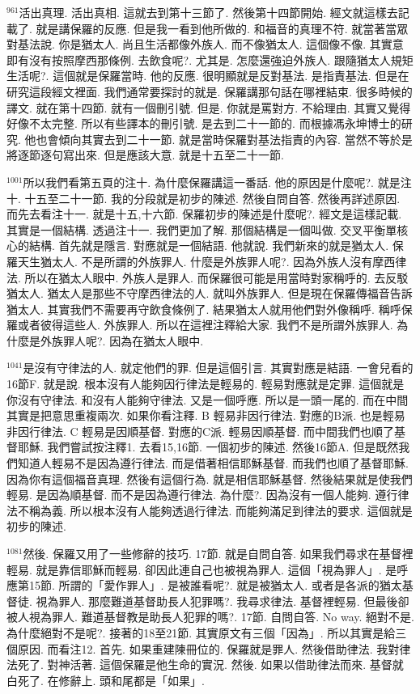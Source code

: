 \documentclass{book}
\begin{document}
$^{961}$活出真理.
活出真相.
這就去到第十三節了.
然後第十四節開始.
經文就這樣去記載了.
就是講保羅的反應.
但是我一看到他所做的.
和福音的真理不符.
就當著當眾對基法說.
你是猶太人.
尚且生活都像外族人.
而不像猶太人.
這個像不像.
其實意即有沒有按照摩西那條例.
去飲食呢?.
尤其是.
怎麼還強迫外族人.
跟隨猶太人規矩生活呢?.
這個就是保羅當時.
他的反應.
很明顯就是反對基法.
是指責基法.
但是在研究這段經文裡面.
我們通常要探討的就是.
保羅講那句話在哪裡結束.
很多時候的譯文.
就在第十四節.
就有一個刪引號.
但是.
你就是罵對方.
不給理由.
其實又覺得好像不太完整.
所以有些譯本的刪引號.
是去到二十一節的.
而根據馮永坤博士的研究.
他也會傾向其實去到二十一節.
就是當時保羅對基法指責的內容.
當然不等於是將逐節逐句寫出來.
但是應該大意.
就是十五至二十一節.

$^{1001}$所以我們看第五頁的注十.
為什麼保羅講這一番話.
他的原因是什麼呢?.
就是注十.
十五至二十一節.
我的分段就是初步的陳述.
然後自問自答.
然後再詳述原因.
而先去看注十一.
就是十五,十六節.
保羅初步的陳述是什麼呢?.
經文是這樣記載.
其實是一個結構.
透過注十一.
我們更加了解.
那個結構是一個叫做.
交叉平衡單核心的結構.
首先就是隱言.
對應就是一個結語.
他就說.
我們新來的就是猶太人.
保羅天生猶太人.
不是所謂的外族罪人.
什麼是外族罪人呢?.
因為外族人沒有摩西律法.
所以在猶太人眼中.
外族人是罪人.
而保羅很可能是用當時對家稱呼的.
去反駁猶太人.
猶太人是那些不守摩西律法的人.
就叫外族罪人.
但是現在保羅傳福音告訴猶太人.
其實我們不需要再守飲食條例了.
結果猶太人就用他們對外像稱呼.
稱呼保羅或者彼得這些人.
外族罪人.
所以在這裡注釋給大家.
我們不是所謂外族罪人.
為什麼是外族罪人呢?.
因為在猶太人眼中.

$^{1041}$是沒有守律法的人.
就定他們的罪.
但是這個引言.
其實對應是結語.
一會兒看的16節F.
就是說.
根本沒有人能夠因行律法是輕易的.
輕易對應就是定罪.
這個就是你沒有守律法.
和沒有人能夠守律法.
又是一個呼應.
所以是一頭一尾的.
而在中間其實是把意思重複兩次.
如果你看注釋.
B 輕易非因行律法.
對應的B派.
也是輕易非因行律法.
C 輕易是因順基督.
對應的C派.
輕易因順基督.
而中間我們也順了基督耶穌.
我們嘗試按注釋1.
去看15,16節.
一個初步的陳述.
然後16節A.
但是既然我們知道人輕易不是因為遵行律法.
而是借著相信耶穌基督.
而我們也順了基督耶穌.
因為你有這個福音真理.
然後有這個行為.
就是相信耶穌基督.
然後結果就是使我們輕易.
是因為順基督.
而不是因為遵行律法.
為什麼?.
因為沒有一個人能夠.
遵行律法不稱為義.
所以根本沒有人能夠透過行律法.
而能夠滿足到律法的要求.
這個就是初步的陳述.

$^{1081}$然後.
保羅又用了一些修辭的技巧.
17節.
就是自問自答.
如果我們尋求在基督裡輕易.
就是靠信耶穌而輕易.
卻因此連自己也被視為罪人.
這個「視為罪人」.
是呼應第15節.
所謂的「愛作罪人」.
是被誰看呢?.
就是被猶太人.
或者是各派的猶太基督徒.
視為罪人.
那麼難道基督助長人犯罪嗎?.
我尋求律法.
基督裡輕易.
但最後卻被人視為罪人.
難道基督教是助長人犯罪的嗎?.
17節.
自問自答.
No way.
絕對不是.
為什麼絕對不是呢?.
接著的18至21節.
其實原文有三個「因為」.
所以其實是給三個原因.
而看注12.
首先.
如果重建陳冊位的.
保羅就是罪人.
然後借助律法.
我對律法死了.
對神活著.
這個保羅是他生命的實況.
然後.
如果以借助律法而來.
基督就白死了.
在修辭上.
頭和尾都是「如果」.
\end{document}
